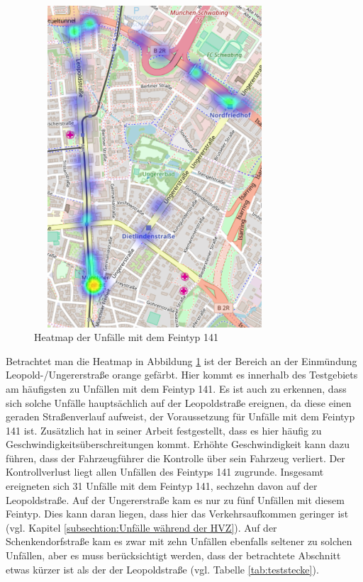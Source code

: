 \begin{savenotes}
	\begin{figure}[H]
		\centering
		\includegraphics[width=9cm,height=12cm]{figures/HM_141}
		\caption[Heatmap der Unfälle mit dem Feintyp 141]{Heatmap der Unfälle mit dem Feintyp 141}\label{fig:Heatmap_141}
	\end{figure}
\end{savenotes}

Betrachtet man die Heatmap in Abbildung \ref{fig:Heatmap_141} ist der Bereich an der Einmündung Leopold-/Ungererstraße orange gefärbt. Hier kommt es innerhalb des Testgebiets am häufigsten zu Unfällen mit dem Feintyp 141. Es ist auch zu erkennen, dass sich solche Unfälle hauptsächlich auf der Leopoldstraße ereignen, da diese einen geraden Straßenverlauf aufweist, der Voraussetzung für Unfälle mit dem Feintyp 141 ist. Zusätzlich hat \Textcite[S. 20]{Bruhn.2018} in seiner Arbeit festgestellt, dass es hier häufig zu Geschwindigkeitsüberschreitungen kommt. Erhöhte Geschwindigkeit kann dazu führen, dass der Fahrzeugführer die Kontrolle über sein Fahrzeug verliert. Der Kontrollverlust liegt allen Unfällen des Feintyps 141 zugrunde. Insgesamt ereigneten sich 31 Unfälle mit dem Feintyp 141, sechzehn davon auf der Leopoldstraße. Auf der Ungererstraße kam es nur zu fünf Unfällen mit diesem Feintyp. Dies kann daran liegen, dass hier das Verkehrsaufkommen geringer ist (vgl. Kapitel \ref{subsechtion:Unfälle während der HVZ}). Auf der Schenkendorfstraße kam es zwar mit zehn Unfällen ebenfalls seltener zu solchen Unfällen, aber es muss berücksichtigt werden, dass der betrachtete Abschnitt etwas kürzer ist als der der Leopoldstraße (vgl. Tabelle \ref{tab:teststecke}).

